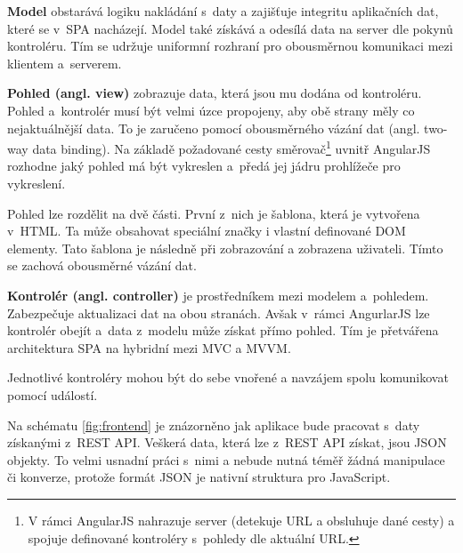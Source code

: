 \begin{description}
    \item {\bf Model} obstarává logiku nakládání s~daty a zajišťuje integritu aplikačních dat, které se v~SPA nacházejí. Model také získává a odesílá data na server dle pokynů kontroléru. Tím se udržuje uniformní rozhraní pro obousměrnou komunikaci mezi klientem a~serverem.

    \item {\bf Pohled (angl. view)} zobrazuje data, která jsou mu dodána od kontroléru. Pohled a~kontrolér musí být velmi úzce propojeny, aby obě strany měly co nejaktuálnější data. To je zaručeno pomocí obousměrného vázání dat (angl. two-way data binding). Na základě požadované cesty směrovač\footnote{V rámci AngularJS nahrazuje server (detekuje URL a obsluhuje dané cesty) a spojuje definované kontroléry s~pohledy dle aktuální URL.} uvnitř AngularJS rozhodne jaký pohled má být vykreslen a~předá jej jádru prohlížeče pro vykreslení.

        Pohled lze rozdělit na dvě části. První z~nich je šablona, která je vytvořena v~HTML. Ta může obsahovat speciální značky i vlastní definované DOM elementy. Tato šablona je následně při zobrazování  a zobrazena uživateli. Tímto se zachová obousměrné vázání dat.

    \item {\bf Kontrolér (angl. controller)} je prostředníkem mezi modelem a~pohledem. Zabezpečuje aktualizaci dat na obou stranách. Avšak v~rámci AngurlarJS lze kontrolér obejít a~data z~modelu může získat přímo pohled. Tím je přetvářena architektura SPA na hybridní mezi MVC a MVVM.

        Jednotlivé kontroléry mohou být do sebe vnořené a navzájem spolu komunikovat pomocí událostí.
\end{description}

Na schématu \ref{fig:frontend} je znázorněno jak aplikace bude pracovat s~daty získanými z~REST API. Veškerá data, která lze z~REST API získat, jsou JSON objekty. To velmi usnadní práci s~nimi a nebude nutná téměř žádná manipulace či konverze, protože formát JSON je nativní struktura pro JavaScript. 

